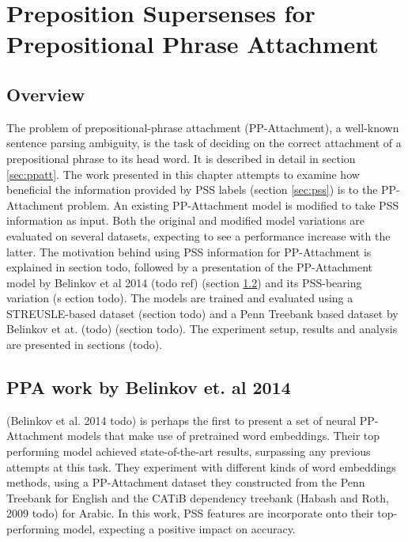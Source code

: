 
\chapter{Preposition Supersenses for  Prepositional Phrase Attachment} %

\label{Chapter3} %


\section{Overview}

The problem of prepositional-phrase attachment (PP-Attachment), a well-known sentence parsing ambiguity, is the task of deciding on the correct attachment of a prepositional phrase to its head word. It is described in detail in section \ref{sec:ppatt}. The work presented in this chapter attempts to examine how beneficial the information provided by PSS labels (section \ref{sec:pss}) is to the PP-Attachment problem. An existing PP-Attachment model is modified to take PSS information as input. Both the original and modified model variations are evaluated on several datasets, expecting to see a performance increase with the latter. The motivation behind using PSS information for PP-Attachment is explained in section todo, followed by a presentation of the PP-Attachment model by Belinkov et al 2014 (todo ref) (section \ref{sec:ppatt-belinkov}) and its PSS-bearing variation (s    ection todo). The models are trained and evaluated using a STREUSLE-based dataset (section todo) and a Penn Treebank based dataset by Belinkov et at. (todo) (section todo). The experiment setup, results and analysis are presented in sections (todo).

\section{PPA work by Belinkov et. al 2014} \label{sec:ppatt-belinkov}

(Belinkov et al. 2014 todo) is perhaps the first to present a set of neural PP-Attachment models that make use of pretrained word embeddings. Their top performing model achieved state-of-the-art results, surpassing any previous attempts at this task. They experiment with different kinds of word embeddings methods, using a PP-Attachment dataset they constructed from the Penn Treebank for English and the CATiB dependency treebank (Habash and Roth, 2009 todo) for Arabic. In this work, PSS features are incorporate onto their top-performing model, expecting a positive impact on accuracy. 

